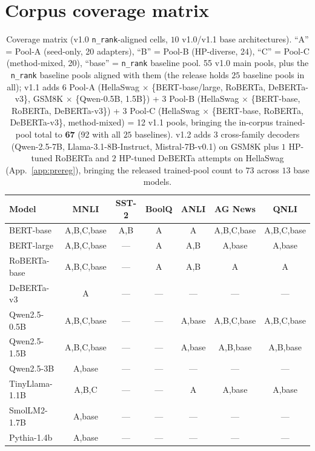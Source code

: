 \documentclass[11pt]{article}
\begin{document}
\section{Corpus coverage matrix}\label{app:coverage}
\begin{table}[t]
\centering
\caption{Coverage matrix (v1.0 \texttt{n\_rank}-aligned cells, $10$ v1.0/v1.1 base architectures). ``A'' = Pool-A (seed-only, 20 adapters), ``B'' = Pool-B (HP-diverse, 24), ``C'' = Pool-C (method-mixed, 20), ``base'' = \texttt{n\_rank} baseline pool. 55 v1.0 main pools, plus the \texttt{n\_rank} baseline pools aligned with them (the release holds $25$ baseline pools in all); v1.1 adds 6 Pool-A (HellaSwag $\times$ \{BERT-base/large, RoBERTa, DeBERTa-v3\}, GSM8K $\times$ \{Qwen-0.5B, 1.5B\}) + 3 Pool-B (HellaSwag $\times$ \{BERT-base, RoBERTa, DeBERTa-v3\}) + 3 Pool-C (HellaSwag $\times$ \{BERT-base, RoBERTa, DeBERTa-v3\}, method-mixed) = 12 v1.1 pools, bringing the in-corpus trained-pool total to \textbf{67} (92 with all $25$ baselines). v1.2 adds $3$ cross-family decoders (Qwen-2.5-7B, Llama-3.1-8B-Instruct, Mistral-7B-v0.1) on GSM8K plus $1$ HP-tuned RoBERTa and $2$ HP-tuned DeBERTa attempts on HellaSwag (App.~\ref{app:prereg}), bringing the released trained-pool count to $73$ across $13$ base models.}
\label{tab:coverage}
\small
\setlength{\tabcolsep}{4pt}
\begin{tabular}{l|cccccc}
\toprule
Model & MNLI & SST-2 & BoolQ & ANLI & AG News & QNLI \\
\midrule
BERT-base & A,B,C,base & A,B & A & A & A,B,C,base & A,B,C,base \\
BERT-large & A,B,C,base & --- & A & A,B & A,base & A,base \\
RoBERTa-base & A,B,C,base & --- & A & A,B & A & A \\
DeBERTa-v3 & A & --- & --- & --- & --- & --- \\
Qwen2.5-0.5B & A,B,C,base & --- & --- & A,base & A,B,C,base & A,B,C,base \\
Qwen2.5-1.5B & A,B,C,base & --- & --- & A,base & A,B,base & A,B,base \\
Qwen2.5-3B & A,base & --- & --- & --- & --- & --- \\
TinyLlama-1.1B & A,B,C & --- & --- & A & A,base & A,base \\
SmolLM2-1.7B & A,base & --- & --- & --- & --- & --- \\
Pythia-1.4b & A,base & --- & --- & --- & --- & --- \\
\bottomrule
\end{tabular}
\end{table}
\end{document}
